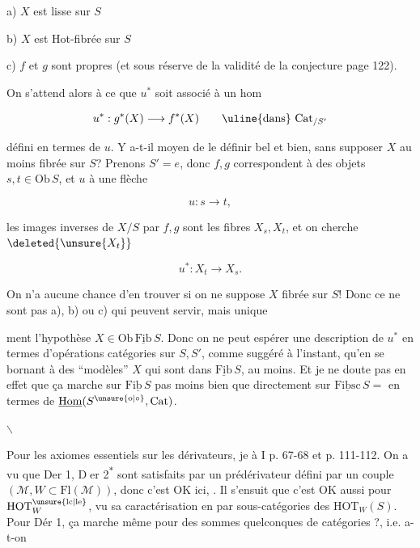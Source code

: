 a) $X$ est lisse sur $S$

b) $X$ est Hot-fibrée sur $S$

c) $f$ et $g$ sont propres (et sous réserve de la validité de la conjecture page 122).

On s'attend alors à ce que $u^*$ soit associé à un hom

\[
u^*:g^*(X)\longrightarrow f^*(X)\qquad\text{\uline{dans}}\ \mathrm{Cat}_{/S'}
\]

défini en termes de $u$. Y  a-t-il moyen de le définir bel et bien, sans supposer $X$  au moins fibrée sur $S$? Prenons $S'=e$, donc $f,g$ correspondent à des objets $s,t\in\mathrm{Ob}\,S$, et $u$ à une flèche

\[
u:s\longrightarrow t,
\]

les images inverses de $X/S$ par $f,g$ sont les fibres $X_s,X_t$, et on cherche $\deleted{\unsure{X_t}}$

\[
u^*:X_t\longrightarrow X_s.
\]

On n'a aucune chance d'en trouver  si on ne suppose $X$ fibrée sur $S$! Donc ce ne sont pas a), b) ou c) qui peuvent  servir, mais unique

ment l'hypothèse $X\in\mathrm{Ob}\,\underline{\mathrm{Fib}}\,S$. Donc on ne peut espérer  une description de $u^*$  en termes d'opérations   catégories sur $S,S'$,  comme suggéré à l'instant, qu'en se bornant à des ``modèles'' $X$ qui sont dans $\underline{\mathrm{Fib}}\,S$,  au moins. Et je ne doute pas en effet que ça marche sur $\underline{\mathrm{Fib}\,S}$ pas moins bien que directement sur $\underline{\mathrm{Fibsc}}\,S=$ en termes de $\underline{\mathrm{Hom}}(S^{\unsure{\mathrm o|\circ}},\mathrm{Cat})$.

\centerline{\(\backslash\)}

Pour les axiomes essentiels sur les dérivateurs, je  à I p. 67-68 et p. 111-112. On a vu que Der 1, \textcircled{\scriptsize Der 2}\textsuperscript{$*$} sont satisfaits par un prédérivateur défini par un couple $(\mathcal M,W\subset\mathrm{Fl}(\mathcal M))$, donc c'est OK ici, . Il s'ensuit que c'est OK aussi pour $\mathrm{HOT}^{\unsure{\mathrm{lc}|\mathrm{le}}}_W$,  vu sa caractérisation  en  par sous-catégories des $\mathrm{HOT}_W(S)$. Pour Dér 1, ça marche  même pour des sommes quelconques de catégories ?, i.e. a-t-on


